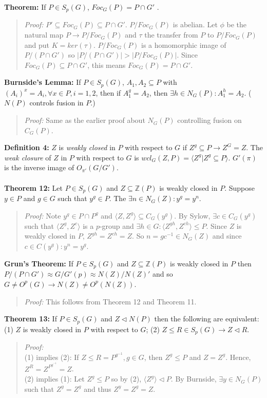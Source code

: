 {\bf Theorem:}  If $P \in S_p(G)$, $Foc_G(P) = P \cap G'$ .
\begin{quote}
\emph{Proof:} $P' \subseteq Foc_G(P) \subseteq P \cap G'$.  $P/Foc_G(P)$ is abelian.  Let $\phi$ be the
natural map $P \rightarrow P/Foc_G(P)$ and $\tau$ the transfer from $P$ to $P/Foc_G(P)$ and put
$K = ker(\tau)$.  $P/Foc_G(P)$ is a homomorphic image of $P/(P \cap G')$ so $|P/(P \cap G')| > |P/Foc_G(P)|$.
Since $Foc_G(P) \subseteq P \cap G'$, this means $Foc_G(P) = P \cap G'$.
\end{quote}
{\bf Burnside's Lemma:}  If $P \in S_p(G)$, $A_1, A_2 \subseteq P$ with 
$(A_i)^x = A_i, \forall x \in P, i= 1, 2$, then
if $A_1^g=A_2$, then $\exists h \in N_G(P): A_1^h=A_2$. ($N(P)$ controls fusion in $P$.)
\begin{quote}
\emph{Proof:}  
Same as the earlier proof about $N_G(P)$ controlling fusion on $C_G(P)$.
\end{quote}
{\bf Definition 4:}
$Z$ is \emph {weakly closed} in $P$ with respect to $G$ if $Z^g \subseteq P \rightarrow Z^G=Z$.
The \emph {weak closure} of $Z$ in $P$ with respect to $G$ is 
$wcl_G(Z, P)= \langle Z^g| Z^g \subseteq P \rangle$.  $G'(\pi)$ is the inverse image of
$O_{\pi'}(G/G')$.
\\
\\
{\bf Theorem 12:}
Let $P \in S_p(G)$ and $Z \subseteq {\mathbb Z}(P)$ 
is weakly closed in $P$.  Suppose $y \in P$ and $g \in G$ such that
$y^g \in P$.  The $\exists n \in N_G(Z): y^g=y^n$.
\begin{quote}
\emph{Proof:}  
Note $y^g \in P \cap P^g$ and $ \langle Z, Z^g \rangle \subseteq C_G(y^g )$.  By Sylow,
$\exists c \in C_G(y^g )$ such that 
$ \langle Z^g, Z^c \rangle $ is a $p$-group and $\exists h \in G:
\langle Z^{gh}, Z^{ch} \rangle \le P$.  Since $Z$ is weakly closed in $P$, 
$Z^{gh}= Z^{ch}= Z$. So
$n= g c^{-1} \in N_G(Z)$ and since $c \in C(y^g): y^n= y^g$.
\end{quote}
{\bf Grun's Theorem:} If $P \in S_p(G)$ and $Z \subseteq {\mathbb Z}(P)$ 
is weakly closed in $P$ then
$P/(P \cap G') \approx G/G' (p) \approx N(Z)/N(Z)'$ and so 
$G \ne O^p(G) \rightarrow N(Z) \ne O^p(N(Z))$.
\begin{quote}
\emph{Proof:}  
This follows from Theorem 12 and Theorem 11.
\end{quote}
{\bf Theorem 13:} If
$P \in S_p(G)$ and $Z \lhd N(P)$ then the following are equivalent:
(1) $Z$ is weakly closed in $P$ with respect to $G$;
(2) $Z \le R \in S_p(G) \rightarrow Z \lhd R$.
\begin{quote}
\emph{Proof:} 
\\
(1) implies (2): If $Z \le R = P^{g^{-1}}, g \in G$, then $Z^g \le P$ and $Z=Z^g$.
Hence, $Z^R= Z^{P^{g^{-1}}} = Z$.\\
(2) implies (1):  Let $Z^g \le P$ so by (2), $ \langle Z^g \rangle \lhd P$.  
By Burnside, $\exists y \in N_G(P)$
such that  $Z^y=Z^g$ and thus $Z^y=Z^g=Z$.
\end{quote}
